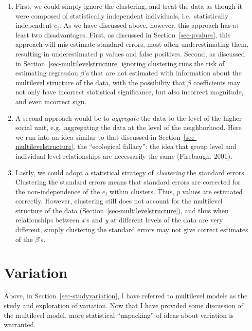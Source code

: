 \documentclass[
  letterpaper,
  DIV=11,
  numbers=noendperiod]{scrreprt}
\providecommand{\tightlist}{%
  \setlength{\itemsep}{0pt}\setlength{\parskip}{0pt}}\usepackage{longtable,booktabs,array}
\begin{document}
\begin{enumerate}
\def\labelenumi{\arabic{enumi}.}
\tightlist
\item
  First, we could simply ignore the clustering, and treat the data as
  though it were composed of statistically independent individuals,
  i.e.~statistically independent \(e_i\). As we have discussed above,
  however, this approach has at least two disadvantages. First, as
  discussed in Section~\ref{sec-pvalues}, this approach will
  mis-estimate standard errors, most often underestimating them,
  resulting in underestimated p values and false positives. Second, as
  discussed in Section~\ref{sec-multilevelstructure} ignoring clustering
  runs the risk of estimating regression \(\beta\)'s that are not
  estimated with information about the multilevel structure of the data,
  with the possibility that \(\beta\) coefficients may not only have
  incorrect statistical significance, but also incorrect magnitude, and
  even incorrect sign.  
\item
  A second approach would be to \emph{aggregate} the data to the level
  of the higher social unit, e.g.~aggregating the data at the level of
  the neighborhood. Here we run into an idea similar to that discussed
  in Section~\ref{sec-multilevelstructure}, the ``ecological fallacy'':
  the idea that group level and individual level relationships are
  necessarily the same (Firebaugh, 2001). 
\item
  Lastly, we could adopt a statistical strategy of \emph{clustering} the
  standard errors. Clustering the standard errors means that standard
  errors are corrected for the non-independence of the \(e_i\) within
  clusters. Thus, \emph{p} values are estimated correctly. However,
  clustering still does not account for the multilevel structure of the
  data (Section~\ref{sec-multilevelstructure}), and thus when
  relationships between \emph{x}'s and \emph{y} at different levels of
  the data are very different, simply clustering the standard errors may
  not give correct estimates of the \(\beta\)'s. 
\end{enumerate}

\section{Variation}\label{sec-studyvariation2}

Above, in Section~\ref{sec-studyvariation}, I have referred to
multilevel models as the study and exploration of variation. Now that I
have provided some discussion of the multilevel model, more statistical
``unpacking'' of ideas about variation is warranted.
\end{document}

